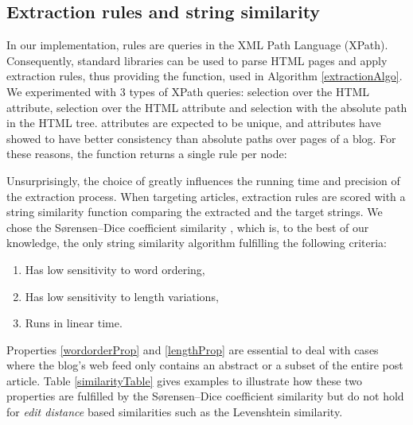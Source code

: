 \subsection{Extraction rules and string similarity}
\label{extractionrulesandstringsimilarity}

In our implementation, rules are queries in the XML Path Language (XPath). Consequently, standard libraries can be used to parse HTML pages and apply extraction rules, thus providing the  function, used in Algorithm \ref{extractionAlgo}. We experimented with 3 types of XPath queries: selection over the HTML  attribute, selection over the HTML  attribute and selection with the absolute path in the HTML tree.  attributes are expected to be unique, and  attributes have showed to have better consistency than absolute paths over pages of a blog. For these reasons, the  function returns a single rule per node:

\allrulesAlgo

Unsurprisingly, the choice of  greatly influences the running time and precision of the extraction process. When targeting articles, extraction rules are scored with a string similarity function comparing the extracted and the target strings. We chose the Sørensen–Dice coefficient similarity \cite{dice1945}, which is, to the best of our knowledge, the only string similarity algorithm fulfilling the following criteria:

\begin{enumerate}
  \item\label{wordorderProp} Has low sensitivity to word ordering,
  \item\label{lengthProp} Has low sensitivity to length variations,
  \item\label{linearProp} Runs in linear time.
\end{enumerate}

Properties \ref{wordorderProp} and \ref{lengthProp} are essential to deal with cases where the blog's web feed only contains an abstract or a subset of the entire post article. Table \ref{similarityTable} gives examples to illustrate how these two properties are fulfilled by the Sørensen–Dice coefficient similarity but do not hold for \emph{edit distance} based similarities such as the Levenshtein \cite{levenshtein1966} similarity.


